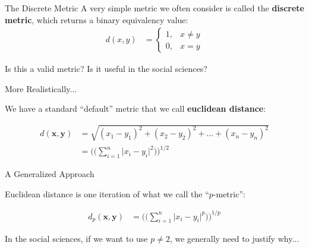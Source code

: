 \documentclass[10pt]{beamer}
\begin{document}
\begin{frame}{The Discrete Metric}
A very simple metric we often consider is called the \textbf{discrete metric}, which returns a binary equivalency value:
\begin{align*}
    d(x,y) &= \begin{cases}
    1, & x \neq y \\
    0, & x = y
    \end{cases}
\end{align*}

Is this a valid metric? Is it useful in the social sciences?

\end{frame}

\begin{frame}{More Realistically...}

We have a standard ``default'' metric that we call \textbf{euclidean distance}:

\begin{align*}
    d(\textbf{x},\textbf{y}) &= \sqrt{(x_1 - y_1)^2 + (x_2 - y_2)^2 + ... + (x_n - y_n)^2} \\
    &= \Bigg(\bigg(\sum_{i=1}^n \Big| x_i - y_i \Big|^2 \bigg) \Bigg)^{1/2}
\end{align*}

\end{frame}

\begin{frame}{A Generalized Approach}

    Euclidean distance is one iteration of what we call the ``$p$-metric'':

    \begin{align*}
        d_p(\textbf{x},\textbf{y}) &= \Bigg(\bigg(\sum_{i=1}^n \Big| x_i - y_i \Big|^p \bigg) \Bigg)^{1/p}
    \end{align*}

    In the social sciences, if we want to use $p \neq 2$, we generally need to justify why...

\end{frame}
\end{document}
